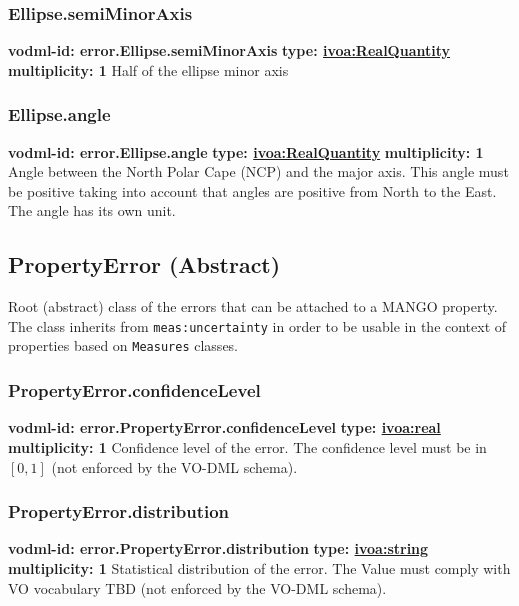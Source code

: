     \subsubsection{Ellipse.semiMinorAxis}
      \textbf{vodml-id: error.Ellipse.semiMinorAxis} \newline
      \textbf{type: \hyperref[sect:ivoa]{ivoa:RealQuantity}} \newline
      \textbf{multiplicity: 1} \newline
      Half of the ellipse minor axis

    \subsubsection{Ellipse.angle}
      \textbf{vodml-id: error.Ellipse.angle} \newline
      \textbf{type: \hyperref[sect:ivoa]{ivoa:RealQuantity}} \newline
      \textbf{multiplicity: 1} \newline
      Angle between the North Polar Cape (NCP) and the major axis. This angle must be positive taking into account that angles are positive from North to the East. The angle has its own unit.

  \subsection{PropertyError (Abstract)}
  \label{sect:error.PropertyError}
    Root (abstract) class of the errors that can be attached to a MANGO property. The class inherits from \texttt{meas:uncertainty} in order to be usable in the context of properties based on \texttt{Measures} classes.

    \subsubsection{PropertyError.confidenceLevel}
      \textbf{vodml-id: error.PropertyError.confidenceLevel} \newline
      \textbf{type: \hyperref[sect:ivoa]{ivoa:real}} \newline
      \textbf{multiplicity: 1} \newline
      Confidence level of the error. The confidence level must be in $[0, 1]$ (not enforced by the VO-DML schema).

    \subsubsection{PropertyError.distribution}
      \textbf{vodml-id: error.PropertyError.distribution} \newline
      \textbf{type: \hyperref[sect:ivoa]{ivoa:string}} \newline
      \textbf{multiplicity: 1} \newline
      Statistical distribution of the error. The Value must comply with VO vocabulary TBD (not enforced by the VO-DML schema).

